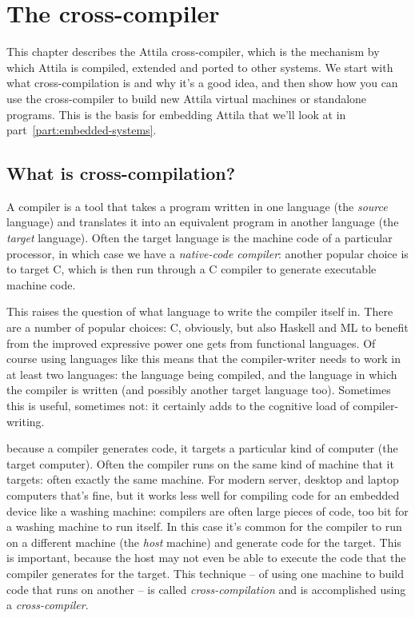 \chapter{The cross-compiler}
\label{chap:cross-compiler}

\begin{precis}
  This chapter describes the Attila cross-compiler, which is the
  mechanism by which Attila is compiled, extended and ported to other
  systems. We start with what cross-compilation is and why it's a good
  idea, and then show how you can use the cross-compiler to build new
  Attila virtual machines or standalone programs. This is the basis
  for embedding Attila that we'll look at in
  part~\ref{part:embedded-systems}.
\end{precis}

\section{What is cross-compilation?}
\label{sec:what-is-cross-compilation}

A compiler is a tool that takes a program written in one language (the
\emph{source} language) and translates it into an equivalent program
in another language (the \emph{target} language). Often the target
language is the machine code of a particular processor, in which case
we have a \emph{native-code compiler}: another popular choice is to
target C, which is then run through a C compiler to generate
executable machine code.

This raises the question of what language to write the compiler itself
in. There are a number of popular choices: C, obviously, but also
Haskell and ML to benefit from the improved expressive power one gets
from functional languages. Of course using languages like this means
that the compiler-writer needs to work in at least two languages: the
language being compiled, and the language in which the compiler is
written (and possibly another target language too). Sometimes this is
useful, sometimes not: it certainly adds to the cognitive load of
compiler-writing.

because a compiler generates code, it targets a particular kind of
computer (the target computer). Often the compiler runs on the same
kind of machine that it targets: often exactly the same machine. For
modern server, desktop and laptop computers that's fine, but it works
less well for compiling code for an embedded device like a washing
machine: compilers are often large pieces of code, too bit for a
washing machine to run itself. In this case it's common for the
compiler to run on a different machine (the \emph{host} machine) and
generate code for the target. This is important, because the host may
not even be able to execute the code that the compiler generates for
the target. This technique -- of using one machine to build code that
runs on another -- is called \emph{cross-compilation} and is
accomplished using a \emph{cross-compiler}.


